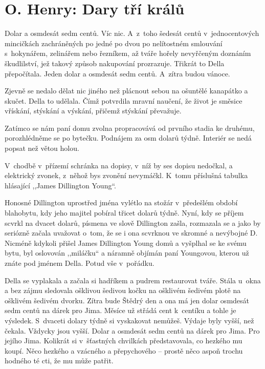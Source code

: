 \section{O. Henry: Dary tří králů}

\medskip

\noindent
Dolar a osmdesát sedm centů. Víc nic. A~z toho šedesát centů v jednocentových mincičkách zachráněných po jedné po dvou po nelítostném smlouvání s hokynářem, zelinářem nebo řezníkem, až tváře hořely nevyřčeným doznáním škudlilství, jež takový způsob nakupování prozrazuje. Třikrát to Della přepočítala. Jeden dolar a osmdesát sedm centů. A~zítra budou vánoce.

Zjevně se nedalo dělat nic jiného než plácnout sebou na ošuntělé kanapátko a skučet. Della to udělala. Čímž potvrdila mravní naučení, že život je směsice vřískání, stýskání a výskání, přičemž stýskání převažuje.

Zatímco se nám paní domu zvolna propracovává od prvního stadia ke druhému, porozhlédněme se po bytečku. Podnájem za osm dolarů týdně. Interiér se nedá popsat než větou holou.

V chodbě v přízemí schránka na dopisy, v níž by ses dopisu nedočkal, a elektrický zvonek, z něhož bys zvonění nevymáčkl. K tomu příslušná tabulka hlásající ,,James Dillington Young``.

Honosné Dillington uprostřed jména vylétlo na stožár v předešlém období blahobytu, kdy jeho majitel pobíral třicet dolarů týdně. Nyní, kdy se příjem scvrkl na dvacet dolarů, písmena ve slově Dillington zašla, rozmazala se a jako by seriózně začala uvažovat o~tom, že se i ona scvrknou ve skromné a nevýbojné D. Nicméně kdykoli přišel James Dillington Young domů a vyšplhal se ke svému bytu, byl oslovován ,,miláčku`` a náramně objímán paní Youngovou, kterou už znáte pod jménem Della. Potud vše v pořádku.

Della se vyplakala a začala si hadříkem a pudrem restaurovat tváře. Stála u~okna a bez zájmu sledovala ošklivou šedivou kočku na ošklivém šedivém plotě na ošklivém šedivém dvorku. Zítra bude Štědrý den a ona má jen dolar osmdesát sedm centů na dárek pro Jima. Měsíce už střádá cent k centíku a tohle je výsledek. S dvaceti dolary týdně si vyskakovat nemůžeš. Výdaje byly vyšší, než čekala. Vždycky jsou vyšší. Dolar a osmdesát sedm centů na dárek pro Jima. Pro jejího Jima. Kolikrát si v šťastných chvilkách představovala, co hezkého mu koupí. Něco hezkého a vzácného a přepychového -- prostě něco aspoň trochu hodného té cti, že mu může patřit.

